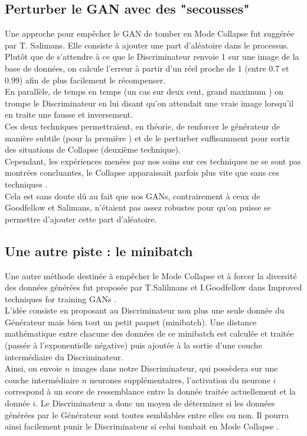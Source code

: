 		\subsection{Perturber le GAN avec des "secousses" } 
		Une approche pour empêcher le GAN de tomber en Mode Collapse fut suggérée par T. Salimans. Elle consiste à ajouter une part d'aléatoire dans le processus. \\
	Plutôt que de s'attendre à ce que le Discriminateur renvoie 1 sur une image de la base de données, on calcule l'erreur à partir d'un réel proche de 1 (entre 0.7 et 0.99) afin de plus facilement le récompenser. \\
	En parallèle, de temps en temps (un cas sur deux cent, grand maximum ) on trompe le Discriminateur en lui disant qu'on attendait une vraie image lorsqu'il en traite une fausse et inversement. \\
	Ces deux techniques permettraient, en théorie, de renforcer le générateur de manière subtile (pour la première ) et de le perturber suffisamment pour sortir des situations de Collapse (deuxième technique).\\
	Cependant, les expériences menées par nos soins sur ces techniques ne se sont pas montrées concluantes, le Collapse apparaissait parfois plus vite que sans ces techniques . \\
	Cela est sans doute dû au fait que nos GANs, contrairement à ceux de Goodfellow et Salimans, n'étaient pas assez robustes pour qu'on puisse se permettre d'ajouter cette part d'aléatoire. 
	
	

	\subsection{Une autre piste : le minibatch}
		Une autre méthode destinée à empêcher le Mode Collapse et à forcer la diversité des données générées fut proposée par T.Salilmans et I.Goodfellow dans Improved techniques for training GANs \cite{salimans_improved_2016}.\\
		L'idée consiste en proposant au Discriminateur non plus une seule donnée du Générateur mais bien tout un petit paquet (minibatch). Une distance mathématique entre chacune des données de ce minibatch est calculée et traitée (passée à l'exponentielle négative) puis ajoutée à la sortie d'une couche intermédiaire du Discriminateur. \\
		Ainsi, on envoie $n$ images dans notre Discriminateur, qui possèdera sur une couche intermédiaire $n$ neurones supplémentaires, l'activation du neurone $i$ correspond à un score de ressemblance entre la donnée traitée actuellement et la donnée $i$. Le Discriminateur a donc un moyen de déterminer si les données générées par le Générateur sont toutes semblables entre elles ou non. Il pourra ainsi facilement punir le Discriminateur si celui tombait en Mode Collapse . \\
		
